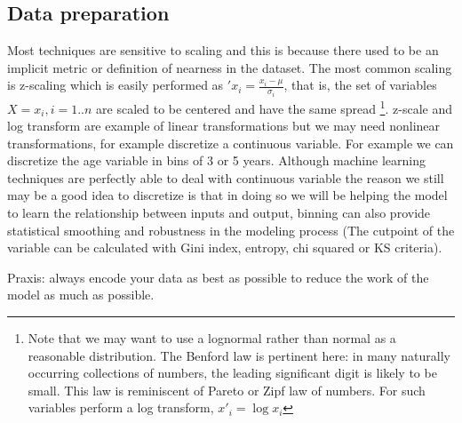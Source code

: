 \documentclass[12pt]{report}
\begin{document}
\subsection{Data preparation}
Most techniques are sensitive to scaling \cite{wu2012foundations} and this is because there used to be an implicit metric or definition of nearness in the dataset. The most common scaling is z-scaling which is easily performed as $\prime{x}_i=\frac{x_i -\mu}{\sigma_i}$, that is, the set of variables $X = x_i, i=1..n$ are scaled to be centered and have the same spread \footnote{Note that we may want to use a lognormal rather than normal as a reasonable distribution. The Benford law is pertinent here: in many naturally occurring collections of numbers, the leading significant digit is likely to be small. This law is reminiscent of Pareto or Zipf law of numbers. For such variables perform a log transform, $x'_i = \log x_i$}.
z-scale and log transform are example of linear transformations but we may need nonlinear transformations, for example discretize a continuous variable. For example we can discretize the age variable in bins of 3 or 5 years. Although machine learning techniques are perfectly able to deal with continuous variable the reason we still may be a good idea to discretize is that in doing so we will be helping the model to learn the relationship between inputs and output, binning can also provide statistical smoothing and robustness in the modeling process (The cutpoint of the variable can be calculated with Gini index, entropy, chi squared or KS criteria).

Praxis: always encode your data as best as possible to reduce the work of the model as much as possible.
\end{document}
